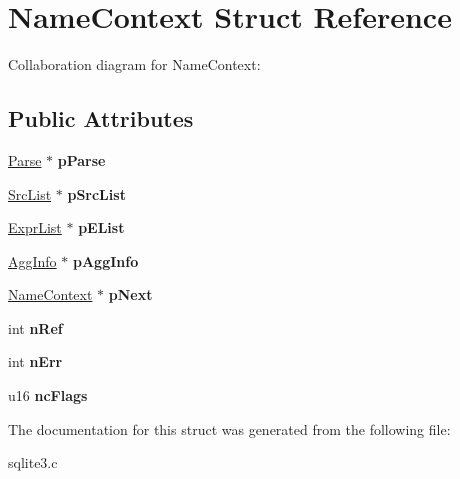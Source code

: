 \hypertarget{structNameContext}{}\section{Name\+Context Struct Reference}
\label{structNameContext}


Collaboration diagram for Name\+Context\+:
\subsection*{Public Attributes}
\begin{DoxyCompactItemize}
\item 
\hyperlink{structParse}{Parse} $\ast$ {\bfseries p\+Parse}\hypertarget{structNameContext_a14635249bf75d5e18124089571dd2386}{}\label{structNameContext_a14635249bf75d5e18124089571dd2386}

\item 
\hyperlink{structSrcList}{Src\+List} $\ast$ {\bfseries p\+Src\+List}\hypertarget{structNameContext_a6ede21da33e2e9bd3d0c5fe90a3ec72c}{}\label{structNameContext_a6ede21da33e2e9bd3d0c5fe90a3ec72c}

\item 
\hyperlink{structExprList}{Expr\+List} $\ast$ {\bfseries p\+E\+List}\hypertarget{structNameContext_a8c752d7fb9b28179156c569cc57ba6f2}{}\label{structNameContext_a8c752d7fb9b28179156c569cc57ba6f2}

\item 
\hyperlink{structAggInfo}{Agg\+Info} $\ast$ {\bfseries p\+Agg\+Info}\hypertarget{structNameContext_aeb3ff72c03dd770d421cadc2195a5644}{}\label{structNameContext_aeb3ff72c03dd770d421cadc2195a5644}

\item 
\hyperlink{structNameContext}{Name\+Context} $\ast$ {\bfseries p\+Next}\hypertarget{structNameContext_a82ce0ec8a3cc3d792e1f38bb5e0ad5fc}{}\label{structNameContext_a82ce0ec8a3cc3d792e1f38bb5e0ad5fc}

\item 
int {\bfseries n\+Ref}\hypertarget{structNameContext_ad68616ce2a58fa1b135e0dcf953bdc97}{}\label{structNameContext_ad68616ce2a58fa1b135e0dcf953bdc97}

\item 
int {\bfseries n\+Err}\hypertarget{structNameContext_aba0b89b42e945c4c96d57a8fe011329c}{}\label{structNameContext_aba0b89b42e945c4c96d57a8fe011329c}

\item 
u16 {\bfseries nc\+Flags}\hypertarget{structNameContext_af1721ec037371cabc7385822cbd9629a}{}\label{structNameContext_af1721ec037371cabc7385822cbd9629a}

\end{DoxyCompactItemize}


The documentation for this struct was generated from the following file\+:\begin{DoxyCompactItemize}
\item 
sqlite3.\+c\end{DoxyCompactItemize}
